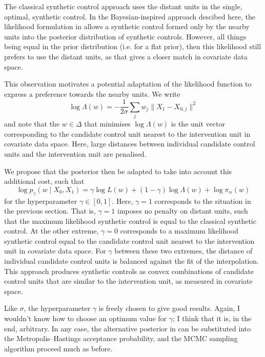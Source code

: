 \documentclass[a4paper, 12pt, onecolumn, singlepage]{article}
\begin{document}
The classical synthetic control approach uses the distant units in the single, optimal, synthetic control.
In the Bayesian-inspired approach descibed here, 
the likelihood formulation in 
allows a synthetic control formed only by the nearby units
into the posterior distribution of synthetic controls.
However, all things being equal in the prior distribution (i.e. for a flat prior),
then this likelihood still prefers to use the distant units,
as that gives a closer match in covariate data space.

This observation motivates a potential adaptation of the likelihood function
to express a preference towards the nearby units.
We write
\[
\log \Lambda(w) = - \frac{1}{2\sigma} \sum_j w_j \| X_1 - X_{0,j} \|^2 
\]
and note that the $w \in \Delta$ that minimises $\log \Lambda(w)$ is
the unit vector corresponding to the candidate control unit
nearest to the intervention unit in covariate data space.
Here, large distances between individual candidate control units and the intervention unit are penalised.

We propose that the posterior then be adapted to take into account this additional cost,
such that
\begin{equation}
\label{eq:altposterior}
\log p_\gamma(w \mid X_0, X_1) = \gamma \log L(w) + (1-\gamma) \log \Lambda(w) + \log \pi_\alpha(w)
\end{equation}
for the hyperparameter $\gamma \in [0,1]$.
Here, $\gamma=1$ corresponds to the situation in the previous section.
That is, $\gamma=1$ imposes no penalty on distant units,
such that the maximum likelihood synthetic control is equal to the classical synthetic control.
At the other extreme, $\gamma=0$ corresponds to a maximum likelihood synthetic control
equal to the candidate control unit nearest to the intervention unit in covariate data space.
For $\gamma$ between these two extremes,
the distance of individual candidate control units is balanced against the fit of the interpolation.
This approach produces synthetic controls as convex combinations of candidate control units
that are similar to the intervention unit, as measured in covariate space.

Like $\sigma$, the hyperparameter $\gamma$ is freely chosen to give good results.
Again, I wouldn't know how to choose an optimum value for $\gamma$;
I think that it is, in the end, arbitrary.
In any case, the alternative posterior in 
can be substituted into the Metropolis--Hastings acceptance probability,
and the MCMC sampling algorithm proceed much as before.
\end{document}
